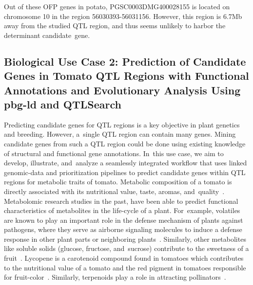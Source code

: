 \documentclass[applsci,article,accept,moreauthors,pdftex]{Definitions/mdpi}
\begin{document}
{Out of these OFP genes in potato, %
PGSC0003DMG400028155 is located on chromosome 10 in the region 56030393-56031156. However, this region is 6.7Mb away from the studied QTL region, %
and thus seems unlikely to harbor the determinant candidate~gene. 

\subsection{Biological Use Case 2: Prediction of Candidate Genes in Tomato QTL Regions with Functional Annotations and Evolutionary Analysis Using pbg-ld and QTLSearch} %
Predicting candidate genes for QTL regions is a key objective in plant genetics and breeding. However, a~single QTL region can contain many genes.
Mining candidate genes from such a QTL region could be done using existing knowledge of structural and functional gene annotations.
In~this use case, %
we aim to develop, illustrate, and~analyze a seamlessly integrated %
workflow that uses linked genomic-data and prioritization pipelines to predict candidate genes within QTL regions for metabolic traits of tomato. Metabolic composition of a tomato is directly associated with its nutritional value, taste, aromas, and~quality~\cite{ballester2016identification}. Metabolomic research studies in the past, have been able to predict functional characteristics of metabolites in the life-cycle of a plant. For~example, volatiles are known to play an important role in the defense mechanism of plants against pathogens, where they serve as airborne signaling molecules to induce a defense response in other plant parts or neighboring plants~\cite{shulaev1997airborne}. Similarly, other metabolites like soluble solids (glucose, fructose, and~sucrose) contribute to the sweetness of a fruit~\cite{luengwilai2010comparison}. Lycopene is a carotenoid compound found in tomatoes which contributes to the nutritional value of a tomato and the red pigment in tomatoes responsible for fruit-color~\cite{di1989lycopene}. Similarly, terpenoids play a role in attracting pollinators~\cite{falara2011tomato}.

}
\end{document}

